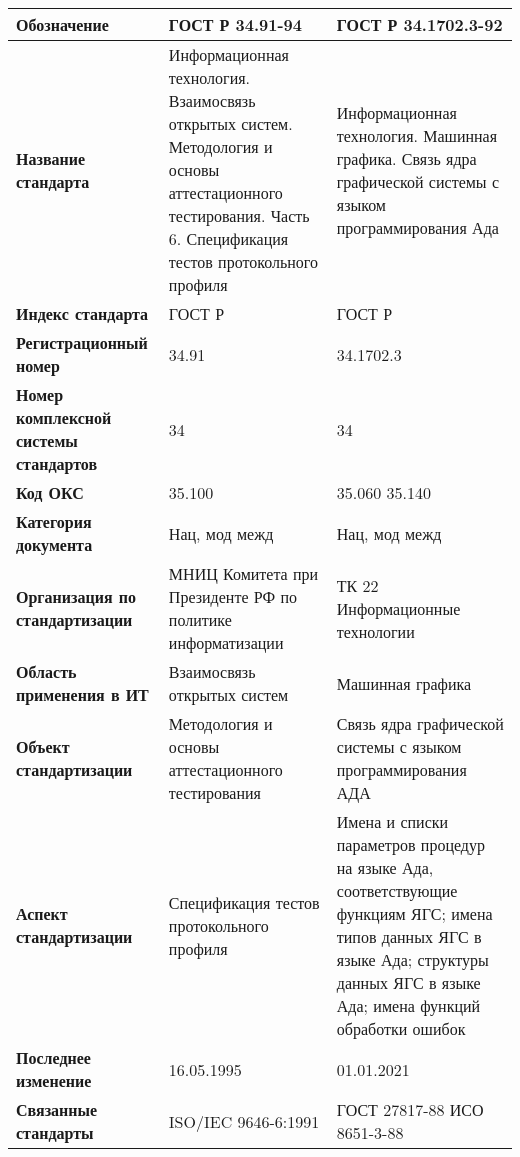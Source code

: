 \begin{table}[h!tp]
	\centering
	\caption{}
	\label{table:national:international:mod}
	\begin{tabular}{|p{10em}|p{12em}|p{12em}|}
		\hline
		\textbf{Обозначение}
			& \textbf{ГОСТ Р 34.91-94}
			& \textbf{ГОСТ Р 34.1702.3-92} \\ \hline
		\textbf{Название стандарта}
			& Информационная технология. Взаимосвязь открытых систем. Методология и основы аттестационного тестирования. Часть 6. Спецификация тестов протокольного профиля
			& Информационная технология. Машинная графика. Связь ядра графической системы с языком программирования Ада \\ \hline
		\textbf{Индекс стандарта}
			& ГОСТ Р & ГОСТ Р \\ \hline
		\textbf{Регистрационный номер}
			& 34.91 & 34.1702.3 \\ \hline
		\textbf{Номер комплексной системы стандартов}
			& 34 & 34 \\ \hline
		\textbf{Код ОКС}
			& 35.100 & 35.060 35.140 \\ \hline
		\textbf{Категория документа}
			& Нац, мод межд & Нац, мод межд \\ \hline
		\textbf{Организация по стандартизации}
			& МНИЦ Комитета при Президенте РФ по политике информатизации
			& ТК 22 Информационные технологии \\ \hline
		\textbf{Область применения в ИТ}
			& Взаимосвязь открытых систем
			& Машинная графика \\ \hline
		\textbf{Объект стандартизации}
			& Методология и основы аттестационного тестирования
			& Связь ядра графической системы с языком программирования АДА \\ \hline
		\textbf{Аспект стандартизации}
			& Спецификация тестов протокольного профиля
			& Имена и списки параметров процедур на языке Ада, соответствующие функциям ЯГС; имена типов данных ЯГС в языке Ада; структуры данных ЯГС в языке Ада; имена функций обработки ошибок \\ \hline
		\textbf{Последнее изменение}
			& 16.05.1995
			& 01.01.2021 \\ \hline
		\textbf{Связанные стандарты}
			& ISO/IEC 9646-6:1991
			& ГОСТ 27817-88 ИСО 8651-3-88 \\ \hline
	\end{tabular}
\end{table}

\clearpage

